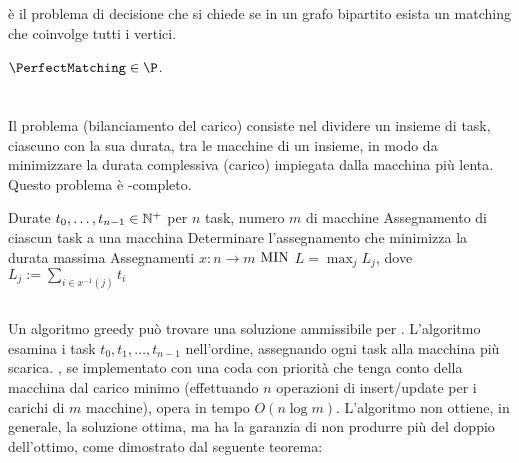 \PerfectMatching è il problema di decisione che si chiede se in un grafo bipartito esista un matching che coinvolge tutti i vertici.

\begin{corollario}
	$\PerfectMatching\in\P$.
\end{corollario}



\section{\LoadBalancing}
Il problema \LoadBalancing (bilanciamento del carico) consiste nel dividere un insieme di task, ciascuno con la sua durata, tra le macchine di un insieme, in modo da minimizzare la durata complessiva (carico) impiegata dalla macchina più lenta. Questo problema è \NPO-completo.

\popt
{\LoadBalancing}
{Durate $t_0,\dots,t_{n-1}\in\mathbb N^+$ per $n$ task, numero $m$ di macchine}
{Assegnamento di ciascun task a una macchina}
{Determinare l'assegnamento che minimizza la durata massima}
{Assegnamenti $x:n\to m$}
{$\mathrm{MIN}$}
{$L=\max_j L_j$, dove $L_j:=\sum_{i\in x^{-1}(j)} t_i$}


\subsection{\GreedyLoadBalancing}
Un algoritmo greedy può trovare una soluzione ammissibile per \LoadBalancing.
L'algoritmo esamina i task $t_0,t_1,\dots,t_{n-1}$ nell'ordine, assegnando ogni task alla macchina più scarica.
\GreedyLoadBalancing, se implementato con una coda con priorità che tenga conto della macchina dal carico minimo (effettuando $n$ operazioni di insert/update per i carichi di $m$ macchine), opera in tempo $O(n\log m)$.
L'algoritmo non ottiene, in generale, la soluzione ottima, ma ha la garanzia di non produrre più del doppio dell'ottimo, come dimostrato dal seguente teorema:

